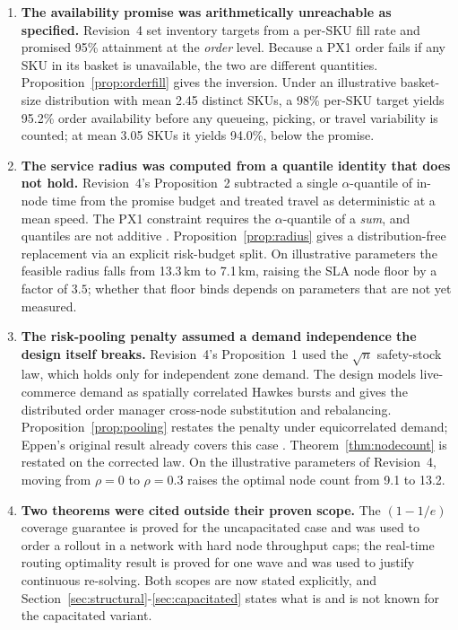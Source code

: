 \begin{enumerate}
\item \textbf{The availability promise was arithmetically unreachable as specified.} Revision~4 set inventory targets from a per-SKU fill rate and promised 95\% attainment at the \emph{order} level. Because a PX1 order fails if any SKU in its basket is unavailable, the two are different quantities. Proposition~\ref{prop:orderfill} gives the inversion. Under an illustrative basket-size distribution with mean 2.45 distinct SKUs, a 98\% per-SKU target yields 95.2\% order availability before any queueing, picking, or travel variability is counted; at mean 3.05 SKUs it yields 94.0\%, below the promise.
\item \textbf{The service radius was computed from a quantile identity that does not hold.} Revision~4's Proposition~2 subtracted a single $\alpha$-quantile of in-node time from the promise budget and treated travel as deterministic at a mean speed. The PX1 constraint requires the $\alpha$-quantile of a \emph{sum}, and quantiles are not additive \cite{artzner1999,embrechts2002}. Proposition~\ref{prop:radius} gives a distribution-free replacement via an explicit risk-budget split. On illustrative parameters the feasible radius falls from 13.3\,km to 7.1\,km, raising the SLA node floor by a factor of $3.5$; whether that floor binds depends on parameters that are not yet measured.
\item \textbf{The risk-pooling penalty assumed a demand independence the design itself breaks.} Revision~4's Proposition~1 used the $\sqrt{n}$ safety-stock law, which holds only for independent zone demand. The design models live-commerce demand as spatially correlated Hawkes bursts and gives the distributed order manager cross-node substitution and rebalancing. Proposition~\ref{prop:pooling} restates the penalty under equicorrelated demand; Eppen's original result already covers this case \cite{eppen1979}. Theorem~\ref{thm:nodecount} is restated on the corrected law. On the illustrative parameters of Revision~4, moving from $\rho=0$ to $\rho=0.3$ raises the optimal node count from 9.1 to 13.2.
\item \textbf{Two theorems were cited outside their proven scope.} The $(1-1/e)$ coverage guarantee is proved for the uncapacitated case and was used to order a rollout in a network with hard node throughput caps; the real-time routing optimality result is proved for one wave and was used to justify continuous re-solving. Both scopes are now stated explicitly, and Section~\ref{sec:structural}-\ref{sec:capacitated} states what is and is not known for the capacitated variant.

\end{enumerate}
